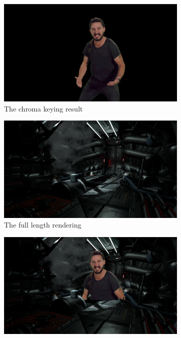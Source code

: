 \begin{figure}[htbp]
	\caption{A comparison of different composition methods in engine}
	\label{fig:zsort:comparison}
	\centering
	\begin{subfigure}[t]{.45\textwidth}
		\centering
		\includegraphics[width=\textwidth]{gfx/composition/Composition-Chroma-Result.png}
		\caption{The chroma keying result}
	\end{subfigure}
	\begin{subfigure}[t]{.45\textwidth}
		\centering
		\includegraphics[width=\textwidth]{gfx/composition/Composition-Full-Render.png}
		\caption{The full length rendering}
	\end{subfigure}
	\begin{subfigure}[t]{.45\textwidth}
		\centering
		\includegraphics[width=\textwidth]{gfx/composition/Composition-Perfect-Realigned.png}

\end{subfigure}
\end{figure}
